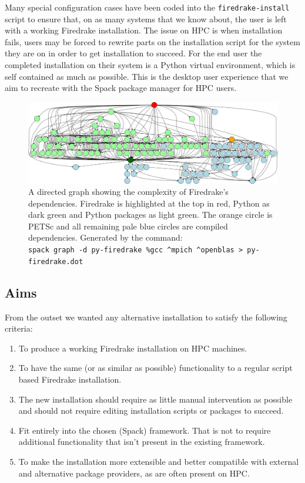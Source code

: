 \documentclass[a4paper,11pt]{article}
\begin{document}
Many special configuration cases have been coded into the \verb`firedrake-install` script to ensure that, on as many systems that we know about, the user is left with a working Firedrake installation.
The issue on HPC is when installation fails, users may be forced to rewrite parts on the installation script for the system they are on in order to get installation to succeed.
For the end user the completed installation on their system is a Python virtual environment, which is self contained as much as possible.
This is the desktop user experience that we aim to recreate with the Spack package manager for HPC users.

\begin{figure}[htp]
	\centering
	\includegraphics[width=\textwidth]{firedrake_deps.png}
	\caption{A directed graph showing the complexity of Firedrake's dependencies. Firedrake is highlighted at the top in red, Python as dark green and Python packages as light green. The orange circle is PETSc and all remaining pale blue circles are compiled dependencies. Generated by the command:\\ \texttt{spack graph -d py-firedrake \%gcc \^{}mpich \^{}openblas \textgreater{} py-firedrake.dot}}
	\label{fig:fddeps}
\end{figure}

\subsection{Aims}
\label{ssec:spack_aims}
From the outset we wanted any alternative installation to satisfy the following criteria:
\begin{enumerate}[topsep=2pt, partopsep=0pt, itemsep=1pt, parsep=1pt]
	\item To produce a working Firedrake installation on HPC machines.
	\item To have the same (or as similar as possible) functionality to a regular script based Firedrake installation.
	\item The new installation should require as little manual intervention as possible and should not require editing installation scripts or packages to succeed.
	\item Fit entirely into the chosen (Spack) framework. That is not to require additional functionality that isn't present in the existing framework.
	\item To make the installation more extensible and better compatible with external and alternative package providers, as are often present on HPC.
\end{enumerate}
\end{document}
